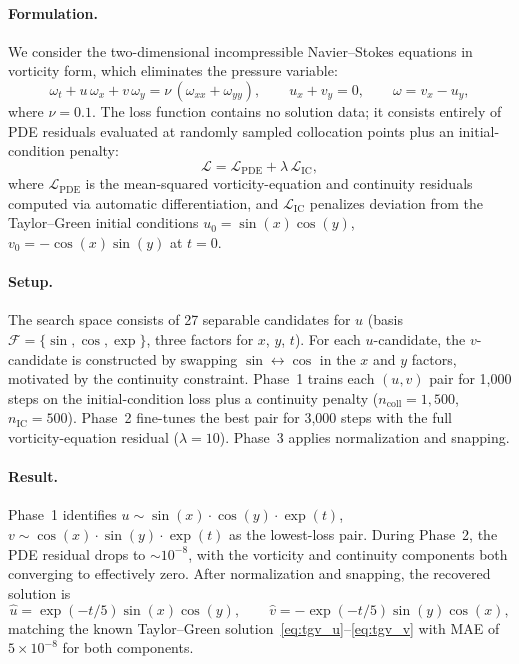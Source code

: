 \paragraph{Formulation.}
We consider the two-dimensional incompressible Navier--Stokes equations in
vorticity form, which eliminates the pressure variable:
\begin{equation}
  \omega_t + u\,\omega_x + v\,\omega_y = \nu\,(\omega_{xx} + \omega_{yy}),
  \qquad
  u_x + v_y = 0,
  \qquad
  \omega = v_x - u_y,
  \label{eq:vorticity_ns}
\end{equation}
where $\nu = 0.1$.  The loss function contains no solution data; it consists
entirely of PDE residuals evaluated at randomly sampled collocation points
plus an initial-condition penalty:
\begin{equation}
  \mathcal{L} = \mathcal{L}_{\mathrm{PDE}} + \lambda\,\mathcal{L}_{\mathrm{IC}},
  \label{eq:pde_loss}
\end{equation}
where $\mathcal{L}_{\mathrm{PDE}}$ is the mean-squared vorticity-equation and
continuity residuals computed via automatic differentiation, and
$\mathcal{L}_{\mathrm{IC}}$ penalizes deviation from the Taylor--Green
initial conditions $u_0 = \sin(x)\cos(y)$, $v_0 = -\cos(x)\sin(y)$ at
$t = 0$.

\paragraph{Setup.}
The search space consists of 27 separable candidates for $u$ (basis
$\mathcal{F} = \{\sin,\cos,\exp\}$, three factors for $x$, $y$, $t$).  For
each $u$-candidate, the $v$-candidate is constructed by swapping $\sin
\leftrightarrow \cos$ in the $x$ and $y$ factors, motivated by the continuity
constraint.  Phase~1 trains each $(u, v)$ pair for 1{,}000 steps on the
initial-condition loss plus a continuity penalty ($n_{\mathrm{coll}} =
1{,}500$, $n_{\mathrm{IC}} = 500$).  Phase~2 fine-tunes the best pair for
3{,}000 steps with the full vorticity-equation residual
($\lambda = 10$).  Phase~3 applies normalization and snapping.

\paragraph{Result.}
Phase~1 identifies $u \sim \sin(x)\!\cdot\!\cos(y)\!\cdot\!\exp(t)$,\;$v \sim
\cos(x)\!\cdot\!\sin(y)\!\cdot\!\exp(t)$ as the lowest-loss pair.  During
Phase~2, the PDE residual drops to $\sim\!10^{-8}$, with the vorticity and
continuity components both converging to effectively zero.  After
normalization and snapping, the recovered solution is
\begin{equation}
  \hat{u} = \exp(-t/5)\sin(x)\cos(y), \qquad
  \hat{v} = -\exp(-t/5)\sin(y)\cos(x),
  \label{eq:pde_residual_recovered}
\end{equation}
matching the known Taylor--Green solution~\eqref{eq:tgv_u}--\eqref{eq:tgv_v}
with MAE of $5 \times 10^{-8}$ for both components.

